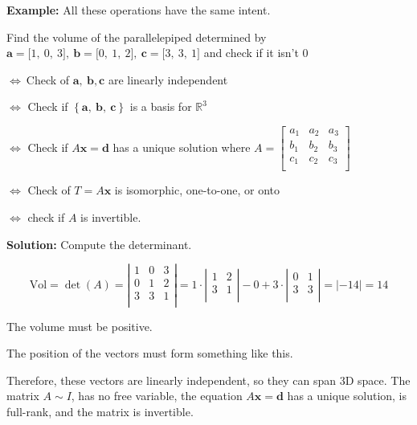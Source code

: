 \documentclass[12pt]{article}
\theoremstyle{plain}
\theoremstyle{remark}
\theoremstyle{definition}
\begin{document}
\textbf{Example:} All these operations have the same intent.

Find the volume of the parallelepiped determined by
\(\mathbf{a} = \lbrack 1,\ 0,\ 3\rbrack,\ \mathbf{b} = \lbrack 0,\ 1,\ 2\rbrack,\ \mathbf{c} = \lbrack 3,\ 3,\ 1\rbrack\)
and check if it isn't 0

\(\Leftrightarrow \ \)Check of
\(\mathbf{a},\ \mathbf{b},\mathbf{c}\) are linearly
independent

\(\Leftrightarrow\) Check if
\(\left\{ \mathbf{a},\ \mathbf{b},\ \mathbf{c} \right\}\) is
a basis for \(\mathbb{R}^{3}\)

\(\Leftrightarrow\) Check if \(A\mathbf{x} = \mathbf{d}\) has a
unique solution where \(A = \begin{bmatrix}
a_{1} & a_{2} & a_{3} \\
b_{1} & b_{2} & b_{3} \\
c_{1} & c_{2} & c_{3} \\
\end{bmatrix}\)

\(\Leftrightarrow\) Check of \(T = A\mathbf{x}\) is isomorphic,
one-to-one, or onto

\(\Leftrightarrow\) check if \(A\) is invertible.

\textbf{Solution:} Compute the determinant.

\[\text{Vol} = \det(A) = \left| \begin{matrix}
1 & 0 & 3 \\
0 & 1 & 2 \\
3 & 3 & 1 \\
\end{matrix} \right| = 1 \cdot \left| \begin{matrix}
1 & 2 \\
3 & 1 \\
\end{matrix} \right| - 0 + 3 \cdot \left| \begin{matrix}
0 & 1 \\
3 & 3 \\
\end{matrix} \right| = | - 14| = 14\]

The volume must be positive.

The position of the vectors must form something like this.


Therefore, these vectors are linearly independent, so they can span 3D
space. The matrix \(A\sim I\), has no free variable, the equation
\(A\mathbf{x} = \mathbf{d}\) has a unique solution, is
full-rank, and the matrix is invertible.
\end{document}

